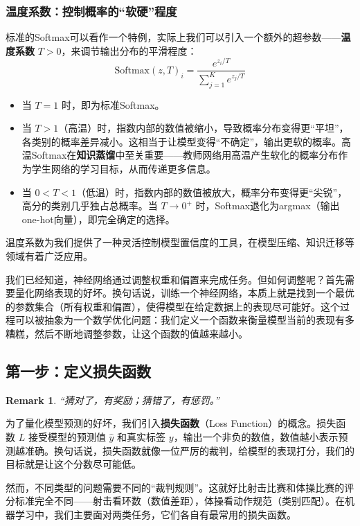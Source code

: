 \documentclass[lang=cn,zihao=-4,a4paper,fontset=windows]{beautybook}
\newtheorem*{remark}{\textbf{Remark}}
\begin{document}
\subsubsection{温度系数：控制概率的“软硬”程度}
标准的Softmax可以看作一个特例，实际上我们可以引入一个额外的超参数——\textbf{温度系数} $T > 0$，来调节输出分布的平滑程度：
\[\text{Softmax}(z, T)_i = \frac{e^{z_i / T}}{\sum_{j=1}^{K} e^{z_j / T}}\]
\begin{itemize}
    \item 当 $T = 1$ 时，即为标准Softmax。
    \item 当 $T > 1$（高温）时，指数内部的数值被缩小，导致概率分布变得更“平坦”，各类别的概率差异减小。这相当于让模型变得“不确定”，输出更软的概率。高温Softmax在\textbf{知识蒸馏}中至关重要——教师网络用高温产生软化的概率分布作为学生网络的学习目标，从而传递更多信息。
    \item 当 $0 < T < 1$（低温）时，指数内部的数值被放大，概率分布变得更“尖锐”，高分的类别几乎独占总概率。当 $T \to 0^+$ 时，Softmax退化为argmax（输出one-hot向量），即完全确定的选择。
\end{itemize}
温度系数为我们提供了一种灵活控制模型置信度的工具，在模型压缩、知识迁移等领域有着广泛应用。

我们已经知道，神经网络通过调整权重和偏置来完成任务。但如何调整呢？首先需要量化网络表现的好坏。换句话说，训练一个神经网络，本质上就是找到一个最优的参数集合（所有权重和偏置），使得模型在给定数据上的表现尽可能好。这个过程可以被抽象为一个数学优化问题：我们定义一个函数来衡量模型当前的表现有多糟糕，然后不断地调整参数，让这个函数的值越来越小。

\subsection{第一步：定义损失函数}

\begin{remark}
    “猜对了，有奖励；猜错了，有惩罚。”
\end{remark}

为了量化模型预测的好坏，我们引入\textbf{损失函数}（Loss Function）的概念。损失函数 $L$ 接受模型的预测值 $\hat{y}$ 和真实标签 $y$，输出一个非负的数值，数值越小表示预测越准确。换句话说，损失函数就像一位严厉的裁判，给模型的表现打分，我们的目标就是让这个分数尽可能低。

然而，不同类型的问题需要不同的“裁判规则”。这就好比射击比赛和体操比赛的评分标准完全不同——射击看环数（数值差距），体操看动作规范（类别匹配）。在机器学习中，我们主要面对两类任务，它们各自有最常用的损失函数。
\end{document}
